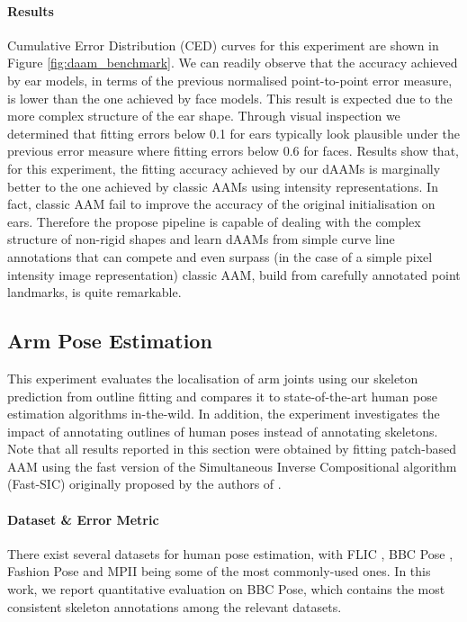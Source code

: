 \paragraph{Results} Cumulative Error Distribution (CED) curves for this experiment are shown in Figure \ref{fig:daam_benchmark}. We can readily observe that the accuracy achieved by ear models, in terms of the previous normalised point-to-point error measure, is lower than the one achieved by face models. This result is expected due to the more complex structure of the ear shape. Through visual inspection we determined that fitting errors below 0.1 for ears typically look plausible under the previous error measure where fitting errors below 0.6 for faces. Results show that, for this experiment, the fitting accuracy achieved by our dAAMs is marginally better to the one achieved by classic AAMs using intensity representations. In fact, classic AAM fail to improve the accuracy of the original initialisation on ears. Therefore the propose pipeline is capable of dealing with the complex structure of non-rigid shapes and learn dAAMs from simple curve line annotations that can compete and even surpass (in the case of a simple pixel intensity image representation) classic AAM, build from carefully annotated point landmarks, is quite remarkable.


\subsection{Arm Pose Estimation}
\label{exp:benchmark}


This experiment evaluates the localisation of arm joints using our skeleton prediction from outline fitting and compares it to state-of-the-art human pose estimation algorithms in-the-wild.
In addition, the experiment investigates the impact of annotating outlines of human poses instead of annotating skeletons. Note that all results reported in this section were obtained by fitting patch-based AAM using the fast version of the Simultaneous Inverse Compositional algorithm (Fast-SIC) originally proposed by the authors of \cite{Papandreou2008}.



\paragraph{Dataset \& Error Metric} There exist several datasets for human pose estimation, with FLIC \cite{sapp2013modec}, BBC Pose \cite{pfister2015flowing}, Fashion Pose \cite{dantone2013human} and MPII \cite{andriluka14cvpr} being some of the most commonly-used ones. In this work, we report quantitative evaluation on BBC Pose, which contains the most consistent skeleton annotations among the relevant datasets.


